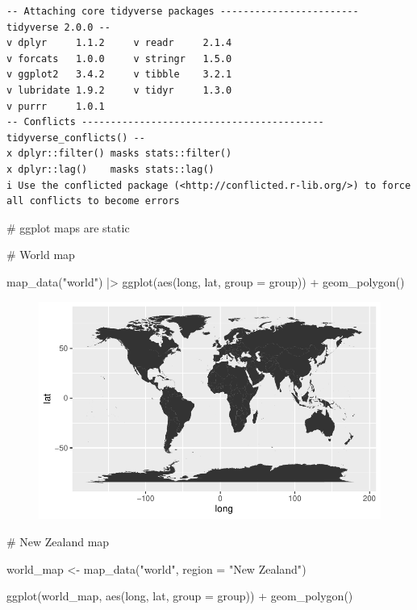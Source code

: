 \documentclass[
  letterpaper,
  DIV=11,
  numbers=noendperiod]{scrartcl}
\newenvironment{Shaded}{\begin{snugshade}}{\end{snugshade}}
\newcommand{\AttributeTok}[1]{\textcolor[rgb]{0.40,0.45,0.13}{#1}}
\newcommand{\CommentTok}[1]{\textcolor[rgb]{0.37,0.37,0.37}{#1}}
\newcommand{\FunctionTok}[1]{\textcolor[rgb]{0.28,0.35,0.67}{#1}}
\newcommand{\NormalTok}[1]{\textcolor[rgb]{0.00,0.23,0.31}{#1}}
\newcommand{\OtherTok}[1]{\textcolor[rgb]{0.00,0.23,0.31}{#1}}
\newcommand{\SpecialCharTok}[1]{\textcolor[rgb]{0.37,0.37,0.37}{#1}}
\newcommand{\StringTok}[1]{\textcolor[rgb]{0.13,0.47,0.30}{#1}}
\begin{document}
\begin{verbatim}
-- Attaching core tidyverse packages ------------------------ tidyverse 2.0.0 --
v dplyr     1.1.2     v readr     2.1.4
v forcats   1.0.0     v stringr   1.5.0
v ggplot2   3.4.2     v tibble    3.2.1
v lubridate 1.9.2     v tidyr     1.3.0
v purrr     1.0.1     
-- Conflicts ------------------------------------------ tidyverse_conflicts() --
x dplyr::filter() masks stats::filter()
x dplyr::lag()    masks stats::lag()
i Use the conflicted package (<http://conflicted.r-lib.org/>) to force all conflicts to become errors
\end{verbatim}

\begin{Shaded}
\begin{Highlighting}[]
\CommentTok{\# ggplot maps are static}

\CommentTok{\# World map}

\FunctionTok{map\_data}\NormalTok{(}\StringTok{"world"}\NormalTok{) }\SpecialCharTok{|\textgreater{}} 
  \FunctionTok{ggplot}\NormalTok{(}\FunctionTok{aes}\NormalTok{(long, lat, }\AttributeTok{group =}\NormalTok{ group)) }\SpecialCharTok{+} 
  \FunctionTok{geom\_polygon}\NormalTok{()}
\end{Highlighting}
\end{Shaded}

\begin{figure}[H]

{\centering \includegraphics{Introduction-to-mapping_files/figure-pdf/unnamed-chunk-1-1.pdf}

}

\end{figure}

\begin{Shaded}
\begin{Highlighting}[]
\CommentTok{\# New Zealand map}

\NormalTok{world\_map }\OtherTok{\textless{}{-}} \FunctionTok{map\_data}\NormalTok{(}\StringTok{"world"}\NormalTok{, }\AttributeTok{region =} \StringTok{"New Zealand"}\NormalTok{)}

\FunctionTok{ggplot}\NormalTok{(world\_map, }\FunctionTok{aes}\NormalTok{(long, lat, }\AttributeTok{group =}\NormalTok{ group)) }\SpecialCharTok{+}
  \FunctionTok{geom\_polygon}\NormalTok{()}
\end{Highlighting}
\end{Shaded}
\end{document}
